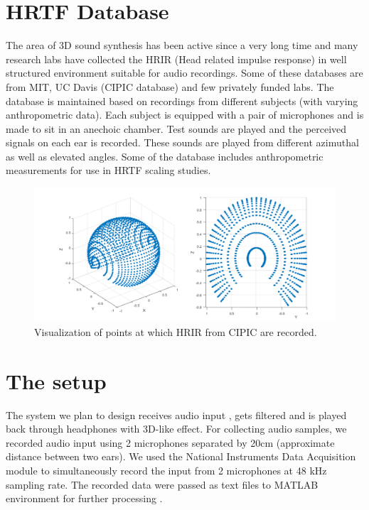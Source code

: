 \documentclass[BTech]{nitkdiss}
\begin{document}
\section{HRTF Database}
The area of 3D sound synthesis has been active since a very long time and many research labs have collected the HRIR (Head related impulse response) in well structured environment suitable for audio recordings. Some of these databases are from MIT, UC Davis (CIPIC database) and few privately funded labs. \newline
The database is maintained based on recordings from different subjects (with varying anthropometric data). Each subject is equipped with a pair of microphones and is made to sit in an anechoic chamber. Test sounds are played and the perceived signals on each ear is recorded. These sounds are played from different azimuthal as well as elevated angles. Some of the database includes anthropometric measurements for use in HRTF scaling studies.
\begin{figure}
\includegraphics[width = \textwidth]{data_points}
\caption{Visualization of points at which HRIR from CIPIC are recorded.}
\end{figure}
\section{The setup}
The system we plan to design receives audio input , gets filtered and is played back through headphones with 3D-like effect. \newline
For collecting audio samples, we recorded audio input using 2 microphones separated by 20cm (approximate distance between two ears). We used the National Instruments Data Acquisition module to simultaneously record the input from 2 microphones at 48 kHz sampling rate. The recorded data were passed as text files to MATLAB environment for further processing .
\end{document}
